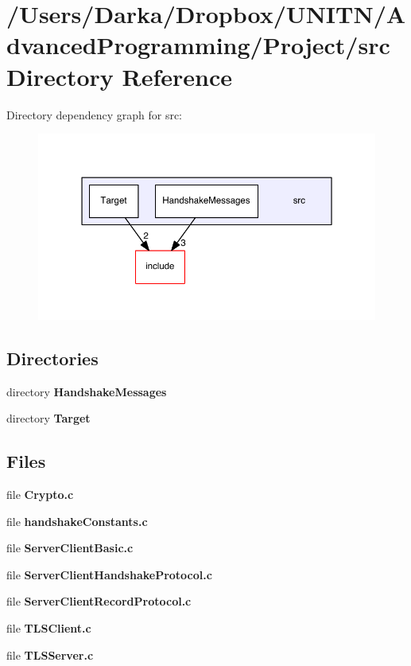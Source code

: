 \section{/\+Users/\+Darka/\+Dropbox/\+U\+N\+I\+T\+N/\+Advanced\+Programming/\+Project/src Directory Reference}
\label{dir_68267d1309a1af8e8297ef4c3efbcdba}
Directory dependency graph for src\+:\nopagebreak
\begin{figure}[H]
\begin{center}
\leavevmode
\includegraphics[width=350pt]{dir_68267d1309a1af8e8297ef4c3efbcdba_dep}
\end{center}
\end{figure}
\subsection*{Directories}
\begin{DoxyCompactItemize}
\item 
directory {\bf Handshake\+Messages}
\item 
directory {\bf Target}
\end{DoxyCompactItemize}
\subsection*{Files}
\begin{DoxyCompactItemize}
\item 
file {\bf Crypto.\+c}
\item 
file {\bf handshake\+Constants.\+c}
\item 
file {\bf Server\+Client\+Basic.\+c}
\item 
file {\bf Server\+Client\+Handshake\+Protocol.\+c}
\item 
file {\bf Server\+Client\+Record\+Protocol.\+c}
\item 
file {\bf T\+L\+S\+Client.\+c}
\item 
file {\bf T\+L\+S\+Server.\+c}
\end{DoxyCompactItemize}
